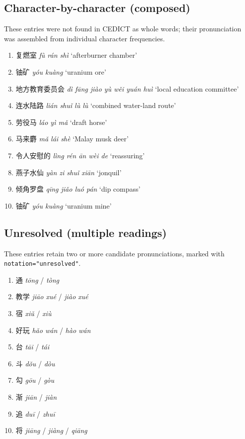 \documentclass[11pt,a4paper]{article}
\begin{document}
\subsection{Character-by-character (composed)}

These entries were not found in CEDICT as whole words; their
pronunciation was assembled from individual character frequencies.

\begin{enumerate}[nosep]
\item 复燃室 \emph{fù rán shì} `afterburner chamber'
\item 铀矿 \emph{yóu kuàng} `uranium ore'
\item 地方教育委员会 \emph{dì fāng jiào yù wěi yuán huì} `local education committee'
\item 连水陆路 \emph{lián shuǐ lù lù} `combined water-land route'
\item 劳役马 \emph{láo yì mǎ} `draft horse'
\item 马来麝 \emph{mǎ lái shè} `Malay musk deer'
\item 令人安慰的 \emph{lìng rén ān wèi de} `reassuring'
\item 燕子水仙 \emph{yàn zi shuǐ xiān} `jonquil'
\item 倾角罗盘 \emph{qīng jiǎo luó pán} `dip compass'
\item 铀矿 \emph{yóu kuàng} `uranium mine'
\end{enumerate}

\subsection{Unresolved (multiple readings)}

These entries retain two or more candidate pronunciations, marked with
\texttt{notation="unresolved"}.

\begin{enumerate}[nosep]
\item 通 \emph{tōng} / \emph{tòng}
\item 教学 \emph{jiāo xué} / \emph{jiào xué}
\item 宿 \emph{xiǔ} / \emph{xiù}
\item 好玩 \emph{hǎo wán} / \emph{hào wán}
\item 台 \emph{tāi} / \emph{tái}
\item 斗 \emph{dǒu} / \emph{dòu}
\item 勾 \emph{gōu} / \emph{gòu}
\item 渐 \emph{jiān} / \emph{jiàn}
\item 追 \emph{duī} / \emph{zhuī}
\item 将 \emph{jiāng} / \emph{jiàng} / \emph{qiāng}
\end{enumerate}
\end{document}
